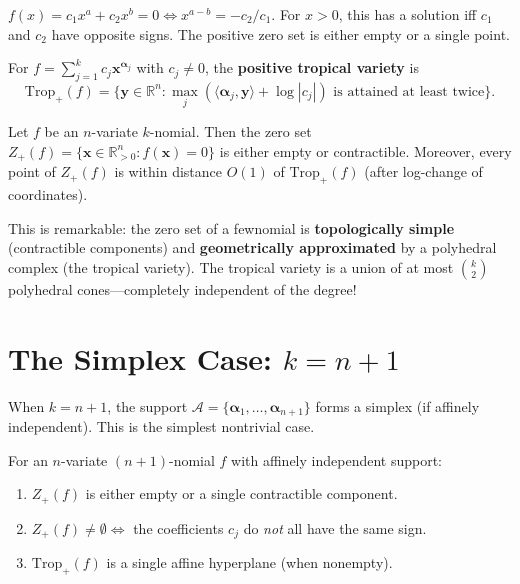 \begin{example}
$f(x) = c_1 x^{a} + c_2 x^{b} = 0 \iff x^{a-b} = -c_2/c_1$.
For $x>0$, this has a solution iff $c_1$ and $c_2$ have opposite signs.
The positive zero set is either empty or a single point.
\end{example}

\begin{definition}
For $f = \sum_{j=1}^k c_j \bm{x}^{\bm{\alpha}_j}$ with $c_j \neq 0$, the \textbf{positive tropical variety} is \cite{rojas2025fewnomial}
\[
\mathrm{Trop}_+(f) = \{\bm{y} \in \mathbb{R}^n : \max_{j} (\langle \bm{\alpha}_j, \bm{y} \rangle + \log|c_j|) \text{ is attained at least twice}\}.
\]
\end{definition}

\begin{theorem}
\label{thm:trop_approx}
Let $f$ be an $n$-variate $k$-nomial. Then the zero set $Z_+(f) = \{\bm{x} \in \mathbb{R}_{>0}^n : f(\bm{x})=0\}$ is either empty or contractible. Moreover, every point of $Z_+(f)$ is within distance $O(1)$ of $\mathrm{Trop}_+(f)$ (after log-change of coordinates).
\end{theorem}

This is remarkable: the zero set of a fewnomial is \textbf{topologically simple} (contractible components) and \textbf{geometrically approximated} by a polyhedral complex (the tropical variety). The tropical variety is a union of at most $\binom{k}{2}$ polyhedral cones---completely independent of the degree! \cite{rojas2025fewnomial}

\section{The Simplex Case: \texorpdfstring{$k = n+1$}{k = n+1}}
\label{sec:few:simplex}

When $k = n+1$, the support $\mathcal{A} = \{\bm{\alpha}_1,\dots,\bm{\alpha}_{n+1}\}$ forms a simplex (if affinely independent). This is the simplest nontrivial case.

\begin{theorem}
For an $n$-variate $(n+1)$-nomial $f$ with affinely independent support:
\begin{enumerate}
    \item $Z_+(f)$ is either empty or a single contractible component.
    \item $Z_+(f) \neq \emptyset \iff$ the coefficients $c_j$ do \emph{not} all have the same sign.
    \item $\mathrm{Trop}_+(f)$ is a single affine hyperplane (when nonempty).
\end{enumerate}
\end{theorem}

